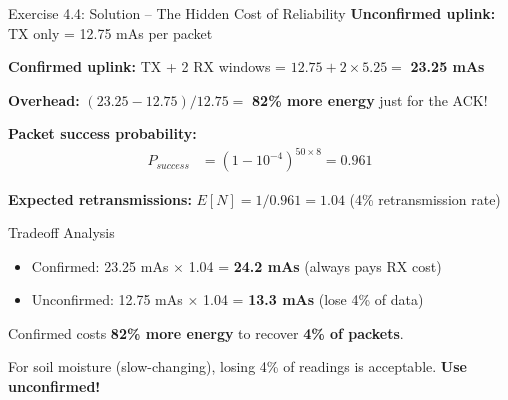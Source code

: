 \documentclass[aspectratio=169,11pt]{beamer}
\begin{document}
\begin{frame}{Exercise 4.4: Solution -- The Hidden Cost of Reliability}
    \textbf{Unconfirmed uplink:} TX only = 12.75 mAs per packet
    
    \textbf{Confirmed uplink:} TX + 2 RX windows = $12.75 + 2 \times 5.25 = $ \textbf{23.25 mAs}
    
    \vspace{0.2cm}
    \textbf{Overhead:} $(23.25 - 12.75) / 12.75 = $ \textbf{82\% more energy} just for the ACK!
    
    \vspace{0.3cm}
    \textbf{Packet success probability:}
    \begin{align*}
        P_{success} &= (1 - 10^{-4})^{50 \times 8} = 0.961
    \end{align*}
    
    \textbf{Expected retransmissions:} $E[N] = 1/0.961 = 1.04$ (4\% retransmission rate)
    
    \vspace{0.2cm}
    \begin{alertblock}{Tradeoff Analysis}
        \begin{itemize}
            \item Confirmed: 23.25 mAs $\times$ 1.04 = \textbf{24.2 mAs} (always pays RX cost)
            \item Unconfirmed: 12.75 mAs $\times$ 1.04 = \textbf{13.3 mAs} (lose 4\% of data)
        \end{itemize}
        Confirmed costs \textbf{82\% more energy} to recover \textbf{4\% of packets}.
        
        For soil moisture (slow-changing), losing 4\% of readings is acceptable. \textbf{Use unconfirmed!}
    \end{alertblock}
\end{frame}
\end{document}
